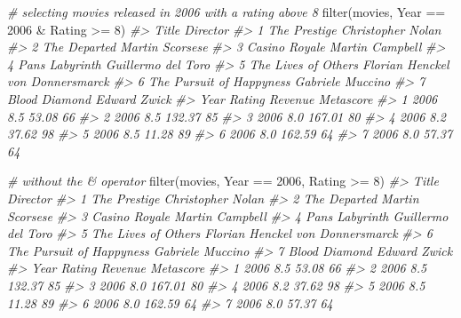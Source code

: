 \documentclass[
]{book}
\newenvironment{Shaded}{\begin{snugshade}}{\end{snugshade}}
\newcommand{\CommentTok}[1]{\textcolor[rgb]{0.56,0.35,0.01}{\textit{#1}}}
\newcommand{\DecValTok}[1]{\textcolor[rgb]{0.00,0.00,0.81}{#1}}
\newcommand{\FunctionTok}[1]{\textcolor[rgb]{0.00,0.00,0.00}{#1}}
\newcommand{\NormalTok}[1]{#1}
\newcommand{\SpecialCharTok}[1]{\textcolor[rgb]{0.00,0.00,0.00}{#1}}
\begin{document}
\begin{Shaded}
\begin{Highlighting}[]
\CommentTok{\# selecting movies released in 2006 with a rating above 8}
\FunctionTok{filter}\NormalTok{(movies, Year }\SpecialCharTok{==} \DecValTok{2006} \SpecialCharTok{\&}\NormalTok{ Rating }\SpecialCharTok{\textgreater{}=} \DecValTok{8}\NormalTok{)}
\CommentTok{\#\textgreater{}                      Title                         Director}
\CommentTok{\#\textgreater{} 1             The Prestige                Christopher Nolan}
\CommentTok{\#\textgreater{} 2             The Departed                  Martin Scorsese}
\CommentTok{\#\textgreater{} 3            Casino Royale                  Martin Campbell}
\CommentTok{\#\textgreater{} 4          Pan\textquotesingle{}s Labyrinth               Guillermo del Toro}
\CommentTok{\#\textgreater{} 5      The Lives of Others Florian Henckel von Donnersmarck}
\CommentTok{\#\textgreater{} 6 The Pursuit of Happyness                 Gabriele Muccino}
\CommentTok{\#\textgreater{} 7            Blood Diamond                     Edward Zwick}
\CommentTok{\#\textgreater{}   Year Rating Revenue Metascore}
\CommentTok{\#\textgreater{} 1 2006    8.5   53.08        66}
\CommentTok{\#\textgreater{} 2 2006    8.5  132.37        85}
\CommentTok{\#\textgreater{} 3 2006    8.0  167.01        80}
\CommentTok{\#\textgreater{} 4 2006    8.2   37.62        98}
\CommentTok{\#\textgreater{} 5 2006    8.5   11.28        89}
\CommentTok{\#\textgreater{} 6 2006    8.0  162.59        64}
\CommentTok{\#\textgreater{} 7 2006    8.0   57.37        64}

\CommentTok{\# without the \& operator}
\FunctionTok{filter}\NormalTok{(movies, Year }\SpecialCharTok{==} \DecValTok{2006}\NormalTok{, Rating }\SpecialCharTok{\textgreater{}=} \DecValTok{8}\NormalTok{)}
\CommentTok{\#\textgreater{}                      Title                         Director}
\CommentTok{\#\textgreater{} 1             The Prestige                Christopher Nolan}
\CommentTok{\#\textgreater{} 2             The Departed                  Martin Scorsese}
\CommentTok{\#\textgreater{} 3            Casino Royale                  Martin Campbell}
\CommentTok{\#\textgreater{} 4          Pan\textquotesingle{}s Labyrinth               Guillermo del Toro}
\CommentTok{\#\textgreater{} 5      The Lives of Others Florian Henckel von Donnersmarck}
\CommentTok{\#\textgreater{} 6 The Pursuit of Happyness                 Gabriele Muccino}
\CommentTok{\#\textgreater{} 7            Blood Diamond                     Edward Zwick}
\CommentTok{\#\textgreater{}   Year Rating Revenue Metascore}
\CommentTok{\#\textgreater{} 1 2006    8.5   53.08        66}
\CommentTok{\#\textgreater{} 2 2006    8.5  132.37        85}
\CommentTok{\#\textgreater{} 3 2006    8.0  167.01        80}
\CommentTok{\#\textgreater{} 4 2006    8.2   37.62        98}
\CommentTok{\#\textgreater{} 5 2006    8.5   11.28        89}
\CommentTok{\#\textgreater{} 6 2006    8.0  162.59        64}
\CommentTok{\#\textgreater{} 7 2006    8.0   57.37        64}


\end{Highlighting}
\end{Shaded}
\end{document}
